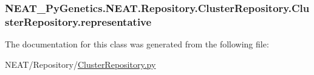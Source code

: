 \subsubsection[{\texorpdfstring{representative}{representative}}]{\setlength{\rightskip}{0pt plus 5cm}N\+E\+A\+T\+\_\+\+Py\+Genetics.\+N\+E\+A\+T.\+Repository.\+Cluster\+Repository.\+Cluster\+Repository.\+representative\hspace{0.3cm}{\ttfamily [static]}}\hypertarget{classNEAT__PyGenetics_1_1NEAT_1_1Repository_1_1ClusterRepository_1_1ClusterRepository_accef80a33d0dd0473ad8c9b3723ec0d9}{}\label{classNEAT__PyGenetics_1_1NEAT_1_1Repository_1_1ClusterRepository_1_1ClusterRepository_accef80a33d0dd0473ad8c9b3723ec0d9}


The documentation for this class was generated from the following file\+:\begin{DoxyCompactItemize}
\item 
N\+E\+A\+T/\+Repository/\hyperlink{ClusterRepository_8py}{Cluster\+Repository.\+py}\end{DoxyCompactItemize}
